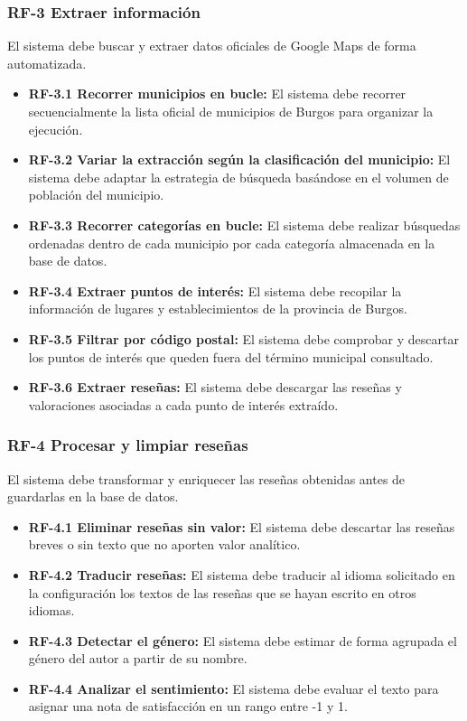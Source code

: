 \subsubsection{RF-3 Extraer información}
El sistema debe buscar y extraer datos oficiales de Google Maps de forma automatizada.

\begin{itemize}
    \item \textbf{RF-3.1 Recorrer municipios en bucle:} El sistema debe recorrer secuencialmente la lista oficial de municipios de Burgos para organizar la ejecución.
    \item \textbf{RF-3.2 Variar la extracción según la clasificación del municipio:} El sistema debe adaptar la estrategia de búsqueda basándose en el volumen de población del municipio.
    \item \textbf{RF-3.3 Recorrer categorías en bucle:} El sistema debe realizar búsquedas ordenadas dentro de cada municipio por cada categoría almacenada en la base de datos.    
    \item \textbf{RF-3.4 Extraer puntos de interés:} El sistema debe recopilar la información de lugares y establecimientos de la provincia de Burgos.    
    \item \textbf{RF-3.5 Filtrar por código postal:} El sistema debe comprobar y descartar los puntos de interés que queden fuera del término municipal consultado.
    \item \textbf{RF-3.6 Extraer reseñas:} El sistema debe descargar las reseñas y valoraciones asociadas a cada punto de interés extraído.
\end{itemize}

\subsubsection{RF-4 Procesar y limpiar reseñas}
El sistema debe transformar y enriquecer las reseñas obtenidas antes de guardarlas en la base de datos.

\begin{itemize}
    
    \item \textbf{RF-4.1 Eliminar reseñas sin valor:} El sistema debe descartar las reseñas breves o sin texto que no aporten valor analítico.
    \item \textbf{RF-4.2 Traducir reseñas:} El sistema debe traducir al idioma solicitado en la configuración los textos de las reseñas que se hayan escrito en otros idiomas.
    \item \textbf{RF-4.3 Detectar el género:} El sistema debe estimar de forma agrupada el género del autor a partir de su nombre.
    \item \textbf{RF-4.4 Analizar el sentimiento:} El sistema debe evaluar el texto para asignar una nota de satisfacción en un rango entre -1 y 1.
\end{itemize}


